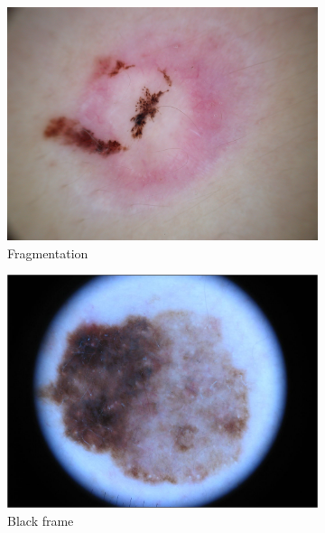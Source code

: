 \documentclass[a4paper,10pt]{article}
\begin{document}
\begin{figure}[h]
\begin{subfigure}{0.32\linewidth}
		\includegraphics[width=0.99\linewidth]{../results/data_examples/127.jpg} 
		\caption{Fragmentation}
		\label{fig:frag-pb}
	\end{subfigure}
	\begin{subfigure}{0.32\linewidth}
		\includegraphics[width=0.99\linewidth]{../results/data_examples/036.jpg} 
		\caption{Black frame}
		\label{fig:black-fr-pb}
	\end{subfigure}
	\begin{subfigure}{0.32\linewidth}

\end{subfigure}
\end{figure}
\end{document}

